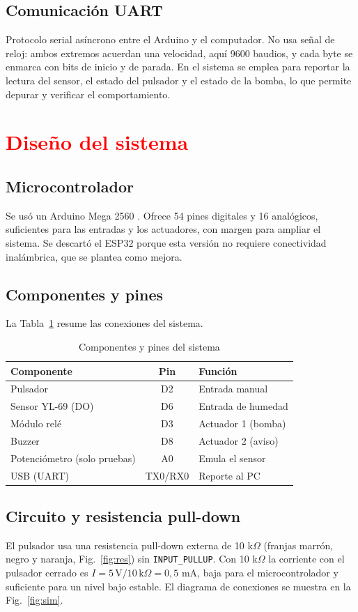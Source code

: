 \documentclass[conference]{IEEEtran}
\let\oldsection\section
\renewcommand{\section}[1]{\oldsection{\textcolor{red}{#1}}}
\begin{document}
\subsection{Comunicación UART}
Protocolo serial asíncrono entre el Arduino y el computador. No usa señal de reloj: ambos extremos acuerdan una velocidad, aquí 9600 baudios, y cada byte se enmarca con bits de inicio y de parada. En el sistema se emplea para reportar la lectura del sensor, el estado del pulsador y el estado de la bomba, lo que permite depurar y verificar el comportamiento.

\section{Diseño del sistema}
\subsection{Microcontrolador}
Se usó un Arduino Mega 2560 \cite{arduino}. Ofrece 54 pines digitales y 16 analógicos, suficientes para las entradas y los actuadores, con margen para ampliar el sistema. Se descartó el ESP32 porque esta versión no requiere conectividad inalámbrica, que se plantea como mejora.
\subsection{Componentes y pines}
La Tabla~\ref{tab:pines} resume las conexiones del sistema.

\begin{table}[h]\centering\caption{Componentes y pines del sistema}\label{tab:pines}
\begin{tabular}{|l|c|l|}\hline
Componente & Pin & Función\\\hline
Pulsador & D2 & Entrada manual\\
Sensor YL-69 (DO) & D6 & Entrada de humedad\\
Módulo relé & D3 & Actuador 1 (bomba)\\
Buzzer & D8 & Actuador 2 (aviso)\\
Potenciómetro (solo pruebas) & A0 & Emula el sensor\\
USB (UART) & TX0/RX0 & Reporte al PC\\\hline
\end{tabular}\end{table}

\subsection{Circuito y resistencia pull-down}
El pulsador usa una resistencia pull-down externa de 10 k$\Omega$ (franjas marrón, negro y naranja, Fig.~\ref{fig:res}) sin \texttt{INPUT\_PULLUP}. Con 10 k$\Omega$ la corriente con el pulsador cerrado es $I=5\,\text{V}/10\,\text{k}\Omega=0{,}5$ mA, baja para el microcontrolador y suficiente para un nivel bajo estable. El diagrama de conexiones se muestra en la Fig.~\ref{fig:sim}.
\end{document}
